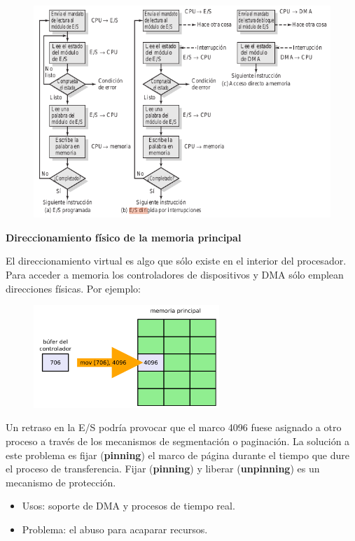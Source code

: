 \documentclass{article}
\begin{document}
\begin{figure}[h]
\centering
\includegraphics[scale=1,width=\textwidth]{DMA.png}
\end{figure}

\textbf{Direccionamiento físico de la memoria principal}

El direccionamiento virtual es algo que sólo existe en el interior del procesador. Para acceder a memoria los controladores de dispositivos y DMA sólo emplean direcciones físicas. Por ejemplo:
\begin{figure}[h]
\centering
\includegraphics[scale=1,width=70mm]{ejemplo1.png}
\end{figure}

Un retraso en la E/S podría provocar que el marco 4096 fuese asignado a otro proceso a través de los mecanismos de segmentación o paginación. La solución a este problema es fijar (\textbf{pinning}) el marco de página durante el tiempo que dure el proceso de transferencia. Fijar (\textbf{pinning}) y liberar (\textbf{unpinning}) es un mecanismo de protección.
\begin{itemize}
\item Usos: soporte de DMA y procesos de tiempo real.

\item Problema: el abuso para acaparar recursos.
\end{itemize}
\end{document}
